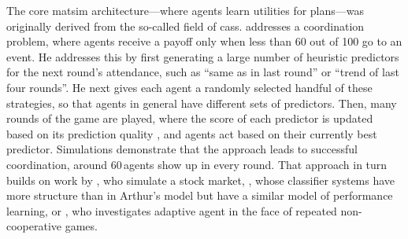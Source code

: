 











The core \gls{matsim} architecture---where agents learn utilities for plans---was originally derived from the so-called field of \glspl{cas}. 
 
%
\citet{ArthurBar} addresses a coordination problem, where agents receive a payoff only when less than 60 out of 100 go to an event.  He addresses this by first generating a large number of heuristic predictors for the next round's attendance, such as ``same as in last round'' or ``trend of last four rounds''.  He next gives each agent a randomly selected handful of these strategies, so that agents in general have different sets of predictors.  Then, many rounds of the game are played, where the score of each predictor is updated based on its prediction quality , and agents act based on their currently best predictor.  Simulations demonstrate that the approach leads to successful coordination, \ie around 60\,agents show up in every round.
%
That approach in turn builds on work by \cite{PalmerEtAl_PhysicaD_1994}, who simulate a stock market, \citet{Holland_1992}, whose classifier systems have more structure than in Arthur's model but have a similar model of performance learning, or \cite{AxelrodBook}, who investigates adaptive agent in the face of repeated non-cooperative games.  

